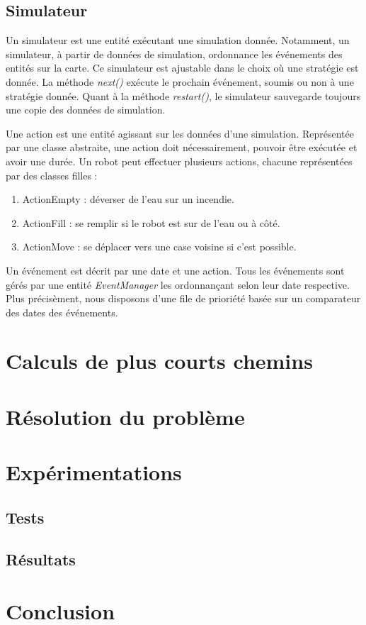 \documentclass[a4paper, 10pt, french]{article}
\begin{document}
	\subsection{Simulateur}
	Un simulateur est une entité exécutant une simulation donnée. Notamment, un simulateur, à partir de données de simulation, ordonnance les événements des entités sur la carte. Ce simulateur est ajustable dans le choix où une stratégie est donnée. La méthode {\it next()} exécute le prochain événement, soumis ou non à une stratégie donnée. Quant à la méthode {\it restart()}, le simulateur sauvegarde toujours une copie des données de simulation. 
	\par\leavevmode\par
	Une action est une entité agissant sur les données d'une simulation. Représentée par une classe abstraite, une action doit nécessairement, pouvoir être exécutée et avoir une durée.
	Un robot peut effectuer plusieurs actions, chacune représentées par des classes filles :
	\begin{enumerate}
		\item ActionEmpty : déverser de l'eau sur un incendie.
		\item ActionFill : se remplir si le robot est sur de l'eau ou à côté.
		\item ActionMove : se déplacer vers une case voisine si c'est possible.
	\end{enumerate}
	\par\leavevmode\par
	Un événement est décrit par une date et une action. Tous les événements sont gérés par une entité {\it EventManager} les ordonnan{\c c}ant selon leur date respective. Plus précisèment, nous disposons d'une file de prioriété basée sur un comparateur des dates des événements.  

\section{Calculs de plus courts chemins}


\section{Résolution du problème}

\section{Expérimentations}

	\subsection{Tests}

	\subsection{Résultats}

\section{Conclusion}
\end{document}
